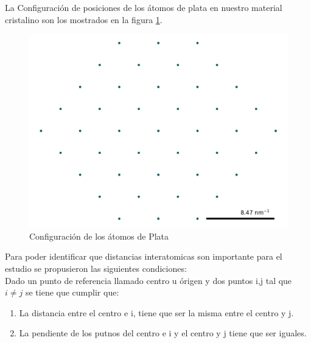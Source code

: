 \documentclass[reprint,amsmath,amssymb,aps,]{revtex4-2}
\begin{document}
La Configuración de posiciones de los átomos de plata en nuestro material cristalino son los mostrados en la figura \ref{fig:inicial}.
\begin{figure}[H]
    \centering
    \includegraphics[scale=0.4]{../Graphics/inicial.png}
    \caption{Configuración de los átomos de Plata}
    \label{fig:inicial}
\end{figure}
Para poder identificar que distancias interatomicas son importante para el estudio se propusieron las siguientes condiciones:\\
Dado un punto de referencia llamado centro u órigen y dos puntos i,j tal que $i\neq j$  se tiene que cumplir que:
\begin{enumerate}
    \item La distancia entre el centro e i, tiene que ser la misma entre el centro y j.
    \item La pendiente de los putnos del centro e i y el centro y j tiene que ser iguales.
\end{enumerate}
\end{document}
